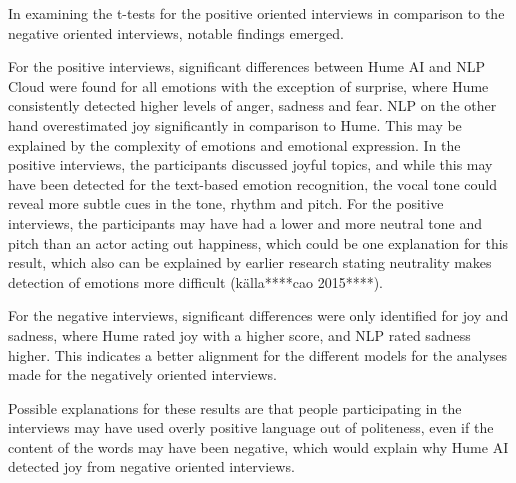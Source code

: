 In examining the t-tests for the positive oriented interviews in comparison to the negative oriented interviews, notable findings emerged.

For the positive interviews, significant differences between Hume AI and NLP Cloud were found for all emotions with the exception of surprise, where Hume consistently detected higher levels of anger, sadness and fear. NLP on the other hand overestimated joy significantly in comparison to Hume. 
This may be explained by the complexity of emotions and emotional expression. In the positive interviews, the participants discussed joyful topics, and while this may have been detected for the text-based emotion recognition, the vocal tone could reveal more subtle cues in the tone, rhythm and pitch. For the positive interviews, the participants may have had a lower and more neutral tone and pitch than an actor acting out happiness, which could be one explanation for this result, which also can be explained by earlier research stating neutrality makes detection of emotions more difficult  (källa****cao 2015****).

For the negative interviews, significant differences were only identified for joy and sadness, where Hume rated joy with a higher score, and NLP rated sadness higher. This indicates a better alignment for the different models for the analyses made for the negatively oriented interviews.

Possible explanations for these results are that people participating in the interviews may have used overly positive language out of politeness, even if the content of the words may have been negative, which would explain why Hume AI detected joy from negative oriented interviews.

